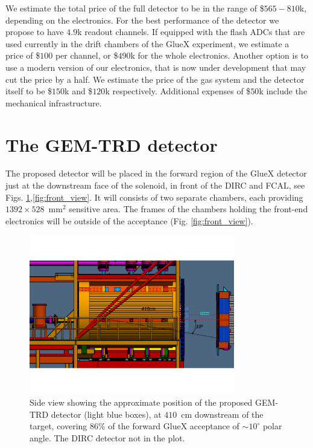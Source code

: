 \documentclass[%
preprint,
nofootinbib,
 amsmath,amssymb,
 aps,
floatfix,
]{revtex4-1}
\begin{document}
We estimate the total price of the full detector to be in the range of 
\$$565-810$k, depending on the electronics.
For the best performance of the detector we propose to have $4.9$k
readout channels.
If equipped with the flash ADCs that are used currently in the drift chambers
of the GlueX experiment, we estimate a price of \$$100$ per channel,
or \$$490$k for the whole electronics.
Another option is to use a modern version of our electronics, 
that is now under development
that may cut the price by a half.
We estimate the price of the gas system and the detector itself
to be \$$150$k and \$$120$k respectively.
Additional expenses of \$$50$k include the mechanical infrastructure.

\newpage
\section{The GEM-TRD detector}
\label{sec:detector}
The proposed detector will be placed in the forward region
of the GlueX detector just at the downstream face of the solenoid,
in front of the DIRC and FCAL,
see Figs. \ref{fig:side_view},\ref{fig:front_view}.
It will consists of two separate chambers,
each providing $1392 \times 528$~mm$^2$ sensitive area. 
The frames of the chambers holding the front-end electronics
will be outside of the acceptance (Fig. \ref{fig:front_view}).
\begin{figure}[]
\includegraphics[width=0.80\textwidth]{./fig/GEM_TRD_side.pdf}
  \caption{
Side view showing the approximate position of the proposed GEM-TRD detector
(light blue boxes), at $410$~cm downstream of the target,
covering $86$\% of the forward GlueX acceptance of $\sim 10^\circ$ 
polar angle.
The DIRC detector not in the plot.
}
  \label{fig:side_view}
\end{figure}
\end{document}
